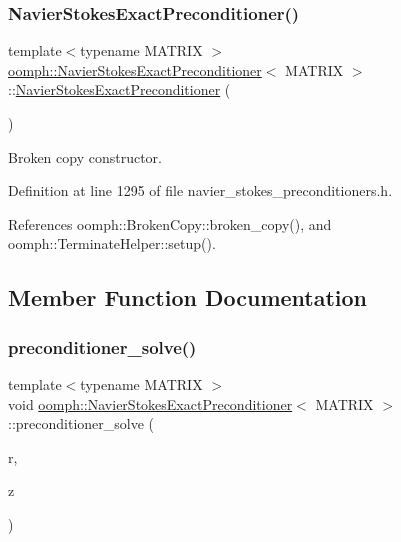 \subsubsection{\texorpdfstring{Navier\+Stokes\+Exact\+Preconditioner()}{NavierStokesExactPreconditioner()}\hspace{0.1cm}{\footnotesize\ttfamily [2/2]}}
{\footnotesize\ttfamily template$<$typename M\+A\+T\+R\+IX $>$ \\
\hyperlink{classoomph_1_1NavierStokesExactPreconditioner}{oomph\+::\+Navier\+Stokes\+Exact\+Preconditioner}$<$ M\+A\+T\+R\+IX $>$\+::\hyperlink{classoomph_1_1NavierStokesExactPreconditioner}{Navier\+Stokes\+Exact\+Preconditioner} (\begin{DoxyParamCaption}\item[{const \hyperlink{classoomph_1_1NavierStokesExactPreconditioner}{Navier\+Stokes\+Exact\+Preconditioner}$<$ M\+A\+T\+R\+IX $>$ \&}]{ }\end{DoxyParamCaption})\hspace{0.3cm}{\ttfamily [inline]}}



Broken copy constructor. 



Definition at line 1295 of file navier\+\_\+stokes\+\_\+preconditioners.\+h.



References oomph\+::\+Broken\+Copy\+::broken\+\_\+copy(), and oomph\+::\+Terminate\+Helper\+::setup().



\subsection{Member Function Documentation}
\mbox{\label{classoomph_1_1NavierStokesExactPreconditioner_a6694cc09bcdaefcb55de5700e39164ff}} 
\subsubsection{\texorpdfstring{preconditioner\+\_\+solve()}{preconditioner\_solve()}}
{\footnotesize\ttfamily template$<$typename M\+A\+T\+R\+IX $>$ \\
void \hyperlink{classoomph_1_1NavierStokesExactPreconditioner}{oomph\+::\+Navier\+Stokes\+Exact\+Preconditioner}$<$ M\+A\+T\+R\+IX $>$\+::preconditioner\+\_\+solve (\begin{DoxyParamCaption}\item[{const \hyperlink{classoomph_1_1Vector}{Vector}$<$ double $>$ \&}]{r,  }\item[{\hyperlink{classoomph_1_1Vector}{Vector}$<$ double $>$ \&}]{z }\end{DoxyParamCaption})}



